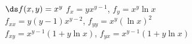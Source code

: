 {$\ds f(x,y) =x^y$
}
{$f_x=yx^{y-1}$, $f_y=x^y \ln x$\\
$f_{xx}=y(y-1)x^{y-2}$, $f_{yy}=x^y (\ln x)^2$\\
$f_{xy}=x^{y-1}(1+y\ln x)$, $f_{yx}=x^{y-1}(1+y\ln x)$\\
}